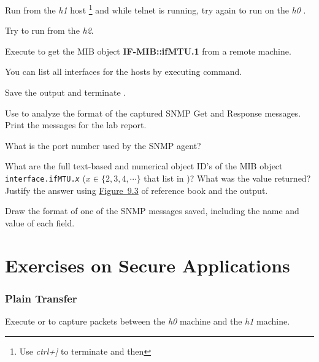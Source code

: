 \documentclass{../UTNetLab}
\begin{document}
    Run from the \textit{h1} host  \footnote{Use \textit{ctrl+]} to terminate  and then } and while telnet is running, try again to run on the \textit{h0}  .

    Try to run  from the \textit{h2}.

    Execute  to get the MIB object \textbf{IF-MIB::ifMTU.1} from a remote machine.
    
    You can list all interfaces for the hosts by executing  command.

    Save the  output and terminate .

    Use  to analyze the format of the captured SNMP Get and Response messages.
    Print the messages for the lab report.
    
    \begin{report}
        \item What is the port number used by the SNMP agent?
        
        \item What are the full text-based and numerical object ID’s of the MIB object \texttt{interface.ifMTU.\textit{x}} ($x \in \{2,3,4,\cdots\}$ that list in )? What was the value returned? Justify the answer using \hyperref[fig:9.3]{Figure~9.3} of reference book and the  output.
        
        \item Draw the format of one of the SNMP messages saved, including the name and value of each field.
    \end{report}

\part{Exercises on Secure Applications}
    
\section{Plain Transfer}
    Execute  or  to capture packets between the \textit{h0} machine and the \textit{h1} machine.
\end{document}
